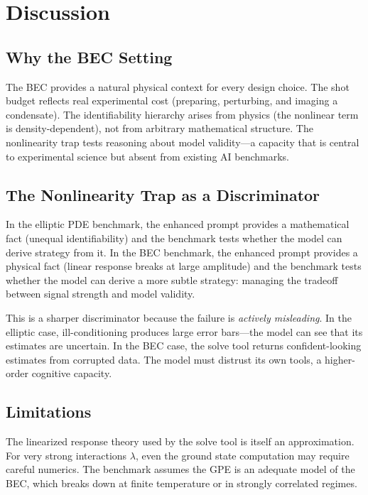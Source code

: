 \documentclass[11pt]{article}
\begin{document}
\section{Discussion}

\subsection{Why the BEC Setting}

The BEC provides a natural physical context for every design choice. The shot budget reflects real experimental cost (preparing, perturbing, and imaging a condensate). The identifiability hierarchy arises from physics (the nonlinear term is density-dependent), not from arbitrary mathematical structure. The nonlinearity trap tests reasoning about model validity---a capacity that is central to experimental science but absent from existing AI benchmarks.

\subsection{The Nonlinearity Trap as a Discriminator}

In the elliptic PDE benchmark, the enhanced prompt provides a mathematical fact (unequal identifiability) and the benchmark tests whether the model can derive strategy from it. In the BEC benchmark, the enhanced prompt provides a physical fact (linear response breaks at large amplitude) and the benchmark tests whether the model can derive a more subtle strategy: managing the tradeoff between signal strength and model validity.

This is a sharper discriminator because the failure is \emph{actively misleading}. In the elliptic case, ill-conditioning produces large error bars---the model can see that its estimates are uncertain. In the BEC case, the solve tool returns confident-looking estimates from corrupted data. The model must distrust its own tools, a higher-order cognitive capacity.

\subsection{Limitations}

The linearized response theory used by the solve tool is itself an approximation. For very strong interactions $\lambda$, even the ground state computation may require careful numerics. The benchmark assumes the GPE is an adequate model of the BEC, which breaks down at finite temperature or in strongly correlated regimes.
\end{document}
